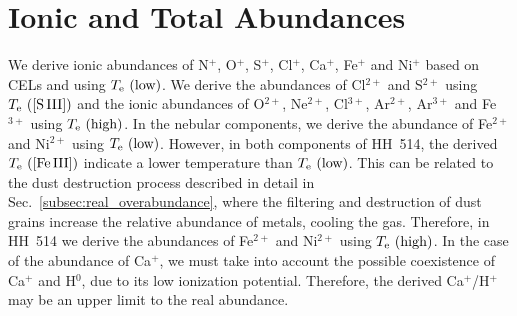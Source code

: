\documentclass[fleqn,usenatbib]{mnras}
\newcommand{\cesar}[1]{{\color{red}C: #1}}
\begin{document}


\section{Ionic and Total Abundances}
\label{sec:ionic_total_abundances}


We derive ionic abundances of N$^{+}$, O$^{+}$, S$^{+}$, Cl$^{+}$, Ca$^{+}$, Fe$^{+}$ and Ni$^{+}$ based on CELs and using $T_{\rm e} \text{ (low)}$. We derive the abundances of Cl$^{2+}$ and S$^{2+}$ using $T_{\rm e} \text{ ([S\thinspace III])}$ and the ionic abundances of O$^{2+}$, Ne$^{2+}$, Cl$^{3+}$, Ar$^{2+}$, Ar$^{3+}$ and Fe$^{3+}$ using $T_{\rm e} \text{ (high)}$. In the nebular components, we derive the abundance of Fe$^{2+}$ and Ni$^{2+}$ using $T_{\rm e} \text{ (low)}$. However, in both components of HH~514, the derived $T_{\rm e} \text{ ([Fe\thinspace III])}$ indicate a lower temperature than $T_{\rm e} \text{ (low)}$. This can be related to the dust destruction process described in detail in Sec.~\ref{subsec:real_overabundance}, where the filtering and destruction of dust grains increase the relative abundance of metals, cooling the gas. Therefore, in HH~514 we derive the abundances of Fe$^{2+}$ and Ni$^{2+}$ using $T_{\rm e} \text{ (high)}$. In the case of the abundance of Ca$^+$, we must take into account the possible coexistence of Ca$^+$ and H$^0$, due to its low ionization potential. Therefore, the derived Ca$^+$/H$^+$ may be an upper limit to the real abundance.
\end{document}
